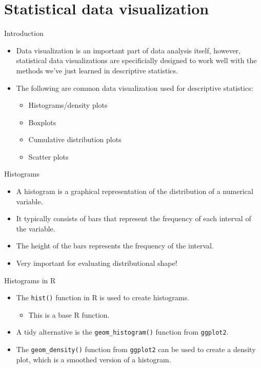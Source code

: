 \documentclass[
  10pt,
  ignorenonframetext,
]{beamer}
\providecommand{\tightlist}{%
  \setlength{\itemsep}{0pt}\setlength{\parskip}{0pt}}\usepackage{longtable,booktabs,array}
\begin{document}
\section{Statistical data
visualization}\label{statistical-data-visualization}

\begin{frame}{Introduction}
\label{introduction}
\begin{itemize}
\item
  Data visualization is an important part of data analysis itself,
  however, statistical data visualizations are specificially designed to
  work well with the methods we've just learned in descriptive
  statistics.
\item
  The following are common data visualization used for descriptive
  statistics:

  \begin{itemize}
  \tightlist
  \item
    Histograms/density plots
  \item
    Boxplots
  \item
    Cumulative distribution plots
  \item
    Scatter plots
  \end{itemize}
\end{itemize}
\end{frame}

\begin{frame}{Histograms}
\label{histograms}
\begin{itemize}
\item
  A histogram is a graphical representation of the distribution of a
  numerical variable.
\item
  It typically consists of bars that represent the frequency of each
  interval of the variable.
\item
  The height of the bars represents the frequency of the interval.
\item
  Very important for evaluating distributional shape!
\end{itemize}
\end{frame}

\begin{frame}[fragile]{Histograms in R}
\label{histograms-in-r}
\begin{itemize}
\item
  The \texttt{hist()} function in R is used to create histograms.

  \begin{itemize}
  \tightlist
  \item
    This is a base R function.
  \end{itemize}
\item
  A tidy alternative is the \texttt{geom\_histogram()} function from
  \texttt{ggplot2}.
\item
  The \texttt{geom\_density()} function from \texttt{ggplot2} can be
  used to create a density plot, which is a smoothed version of a
  histogram.
\end{itemize}
\end{frame}
\end{document}

